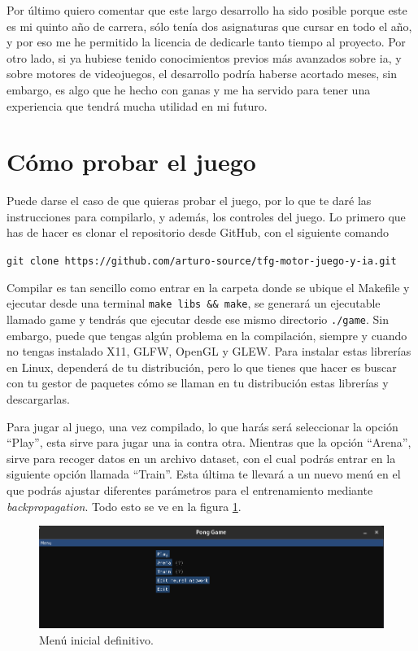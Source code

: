 Por último quiero comentar que este largo desarrollo ha sido posible porque este es mi quinto año de carrera, sólo tenía dos asignaturas que cursar en todo el año, y por eso me he permitido la licencia de dedicarle tanto tiempo al proyecto. Por otro lado, si ya hubiese tenido conocimientos previos más avanzados sobre \gls{ia}, y sobre motores de videojuegos, el desarrollo podría haberse acortado meses, sin embargo, es algo que he hecho con ganas y me ha servido para tener una experiencia que tendrá mucha utilidad en mi futuro.

\section{Cómo probar el juego}
Puede darse el caso de que quieras probar el juego, por lo que te daré las instrucciones para compilarlo, y además, los controles del juego. Lo primero que has de hacer es clonar el repositorio desde GitHub, con el siguiente comando

\texttt{git clone https://github.com/arturo-source/tfg-motor-juego-y-ia.git}

Compilar es tan sencillo como entrar en la carpeta donde se ubique el Makefile y ejecutar desde una terminal \texttt{make libs \&\& make}, se generará un ejecutable llamado game y tendrás que ejecutar desde ese mismo directorio \texttt{./game}. Sin embargo, puede que tengas algún problema en la compilación, siempre y cuando no tengas instalado X11, GLFW, OpenGL y GLEW. Para instalar estas librerías en Linux, dependerá de tu distribución, pero lo que tienes que hacer es buscar con tu gestor de paquetes cómo se llaman en tu distribución estas librerías y descargarlas.

Para jugar al juego, una vez compilado, lo que harás será seleccionar la opción ``Play'', esta sirve para jugar una \gls{ia} contra otra. Mientras que la opción ``Arena'', sirve para recoger datos en un archivo dataset, con el cual podrás entrar en la siguiente opción llamada ``Train''. Esta última te llevará a un nuevo menú en el que podrás ajustar diferentes parámetros para el entrenamiento mediante \textit{backpropagation}. Todo esto se ve en la figura \ref{Menu inicial definitivo}.
\begin{figure}[H]
	\centering
	\includegraphics[width=15cm]{archivos/imagenes/menu-inicia-definitivo.png}
	\caption{Menú inicial definitivo.}
	\label{Menu inicial definitivo}
\end{figure}

